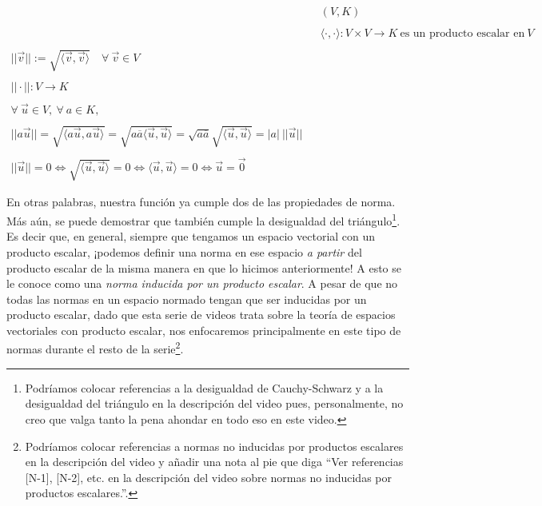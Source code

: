 \documentclass[12pt,dvipsnames]{article}
\numberwithin{equation}{section}
\begin{document}
\begin{align*}
    & &(V,K) \\
    \\
    & &\langle \cdot , \cdot \rangle : V\times V\to K \ \text{es un producto escalar en} \ V\\
    \\
    ||\vec{v}||:=\sqrt{\langle \vec{v} , \vec{v} \rangle} \quad \forall \ \vec{v}\in V\\
    \\
    ||\cdot||:V\to K\\
    \\
    \forall \ \vec{u}\in V, \ \forall \ a\in K,\\
    \\
    ||a\vec{u}|| = \sqrt{\langle a\vec{u} , a\vec{u} \rangle} = \sqrt{a\overline{a}\langle \vec{u} , \vec{u} \rangle} = \sqrt{a\overline{a}} \sqrt{\langle \vec{u} , \vec{u} \rangle} = |a| \ ||\vec{u}||\\
    \\
    ||\vec{u}|| = 0 \iff \sqrt{\langle \vec{u} , \vec{u} \rangle} = 0 \iff \langle \vec{u} , \vec{u} \rangle = 0 \iff \vec{u} = \vec{0}
\end{align*}

\noindent En otras palabras, nuestra función ya cumple dos de las propiedades de norma. Más aún, se puede demostrar que también cumple la desigualdad del triángulo\footnote{Podríamos colocar referencias a la desigualdad de Cauchy-Schwarz y a la desigualdad del triángulo en la descripción del video pues, personalmente, no creo que valga tanto la pena ahondar en todo eso en este video.}. Es decir que, en general, siempre que tengamos un espacio vectorial con un producto escalar, ¡podemos definir una norma en ese espacio \emph{a partir} del producto escalar de la misma manera en que lo hicimos anteriormente! A esto se le conoce como una \emph{norma inducida por un producto escalar}. A pesar de que no todas las normas en un espacio normado tengan que ser inducidas por un producto escalar, dado que esta serie de videos trata sobre la teoría de espacios vectoriales con producto escalar, nos enfocaremos principalmente en este tipo de normas durante el resto de la serie\footnote{Podríamos colocar referencias a normas no inducidas por productos escalares en la descripción del video y añadir una nota al pie que diga ``Ver referencias [N-1], [N-2], etc. en la descripción del video sobre normas no inducidas por productos escalares.''.}.

\end{document}
